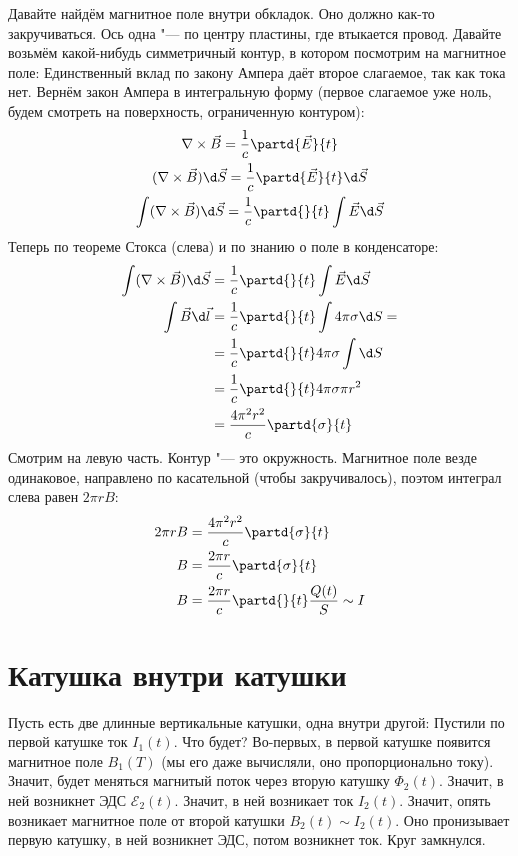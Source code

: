 	Давайте найдём магнитное поле внутри обкладок.
	Оно должно как-то закручиваться.
	Ось одна "--- по центру пластины, где втыкается провод.
	Давайте возьмём какой-нибудь симметричный контур, в котором посмотрим на магнитное поле:
	Единственный вклад по закону Ампера даёт второе слагаемое, так как тока нет.
	Вернём закон Ампера в интегральную форму (первое слагаемое уже ноль, будем смотреть на поверхность, ограниченную контуром):
	\begin{gather*}
		\nabla \times \vec B = \frac 1c \partd{\vec E}{t} \\
		(\nabla \times \vec B) \d \vec S = \frac 1c \partd{\vec E}{t} \d \vec S \\
		\int (\nabla \times \vec B) \d \vec S = \frac 1c \partd{}{t} \int \vec E \d \vec S \\
	\end{gather*}
	Теперь по теореме Стокса (слева) и по знанию о поле в конденсаторе:
	\begin{align*}
		\int (\nabla \times \vec B) \d \vec S &= \frac 1c \partd{}{t} \int \vec E \d \vec S \\
		\int \vec B \d \vec l &= \frac 1c \partd{}{t} \int 4\pi\sigma \d S =\\
			&= \frac 1c \partd{}{t} 4\pi\sigma \int \d S \\
			&= \frac 1c \partd{}{t} 4\pi\sigma \pi r^2 \\
			&= \frac{4\pi^2r^2}c \partd{\sigma}{t} \\
	\end{align*}
	Смотрим на левую часть.
	Контур "--- это окружность.
	Магнитное поле везде одинаковое, направлено по касательной (чтобы закручивалось),
	поэтом интеграл слева равен $2 \pi r B$:
	\begin{align*}
		2\pi r B &= \frac{4\pi^2r^2}c \partd{\sigma}{t} \\
		B &= \frac{2\pi r}c \partd{\sigma}{t} \\
		B &= \frac{2\pi r}c \partd{}{t} \frac{Q(t)}{S} \sim I \\
	\end{align*}

\section{Катушка внутри катушки}
	Пусть есть две длинные вертикальные катушки, одна внутри другой:
	Пустили по первой катушке ток $I_1(t)$.
	Что будет?
	Во-первых, в первой катушке появится магнитное поле $B_1(T)$ (мы его даже вычисляли, оно пропорционально току).
	Значит, будет меняться магнитый поток через вторую катушку $\Phi_2(t)$.
	Значит, в ней возникнет ЭДС $\mathcal{E}_2(t)$.
	Значит, в ней возникает ток $I_2(t)$.
	Значит, опять возникает магнитное поле от второй катушки $B_2(t) \sim I_2(t)$.
	Оно пронизывает первую катушку, в ней возникнет ЭДС, потом возникнет ток.
	Круг замкнулся.

